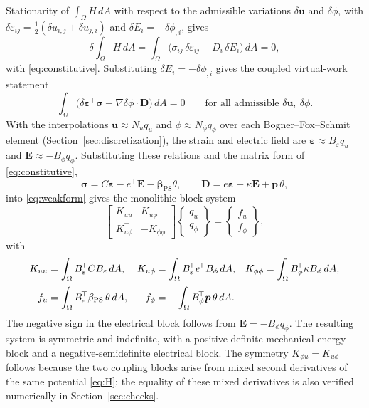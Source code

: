 \documentclass[pdflatex,sn-mathphys-num]{sn-jnl}
\begin{document}
Stationarity of $\int_\Omega H\,dA$ with respect to the admissible variations
$\delta\bm u$ and $\delta\phi$, with
$\delta\varepsilon_{ij}=\tfrac12(\delta u_{i,j}+\delta u_{j,i})$ and
$\delta E_i=-\delta\phi_{,i}$, gives
\begin{equation}
\delta\!\int_\Omega H\,dA
=\int_\Omega\big(\sigma_{ij}\,\delta\varepsilon_{ij}
-D_i\,\delta E_i\big)\,dA=0,
\label{eq:stationarity}
\end{equation}
with \eqref{eq:constitutive}. Substituting
$\delta E_i=-\delta\phi_{,i}$ gives the coupled virtual-work statement
\begin{equation}
\int_\Omega\big(\delta\bm\varepsilon^{\!\top}\bm\sigma
+\nabla\delta\phi\cdot\bm D\big)\,dA=0
\qquad\text{for all admissible }\delta\bm u,\ \delta\phi.
\label{eq:weakform}
\end{equation}
With the interpolations $\bm u\approx N_uq_u$ and
$\phi\approx N_\phi q_\phi$ over each Bogner--Fox--Schmit element
(Section~\ref{sec:discretization}), the strain and electric field are
$\bm\varepsilon\approx B_\varepsilon q_u$ and
$\bm E\approx-B_\phi q_\phi$. Substituting these relations and the matrix form of
\eqref{eq:constitutive},
\[
\bm\sigma=C\bm\varepsilon-e^{\!\top}\bm E
-\bm\beta_{\mathrm{PS}}\theta,
\qquad
\bm D=e\bm\varepsilon+\kappa\bm E+\bm p\,\theta,
\]
into \eqref{eq:weakform} gives the monolithic block system
\begin{equation}
\begin{bmatrix}
K_{uu} & K_{u\phi}\\
K_{u\phi}^{\!\top} & -K_{\phi\phi}
\end{bmatrix}
\begin{Bmatrix}q_u\\q_\phi\end{Bmatrix}
=
\begin{Bmatrix}f_u\\f_\phi\end{Bmatrix},
\label{eq:global}
\end{equation}
with
\begin{align}
K_{uu}&=\int_\Omega B_\varepsilon^{\!\top}CB_\varepsilon\,dA, &
K_{u\phi}&=\int_\Omega B_\varepsilon^{\!\top}e^{\!\top}B_\phi\,dA, &
K_{\phi\phi}&=\int_\Omega B_\phi^{\!\top}\kappa B_\phi\,dA,\notag\\[2pt]
f_u&=\int_\Omega B_\varepsilon^{\!\top}\beta_{\mathrm{PS}}\,\theta\,dA, &
f_\phi&=-\int_\Omega B_\phi^{\!\top}\bm p\,\theta\,dA.& &
\label{eq:elementmats}
\end{align}
The negative sign in the electrical block follows from
$\bm E=-B_\phi q_\phi$. The resulting system is symmetric and indefinite, with a
positive-definite mechanical energy block and a negative-semidefinite electrical
block. The symmetry
$K_{\phi u}=K_{u\phi}^{\!\top}$ follows because the two coupling blocks arise from
mixed second derivatives of the same potential \eqref{eq:H}; the equality of these
mixed derivatives is also verified numerically in Section~\ref{sec:checks}.
\end{document}
